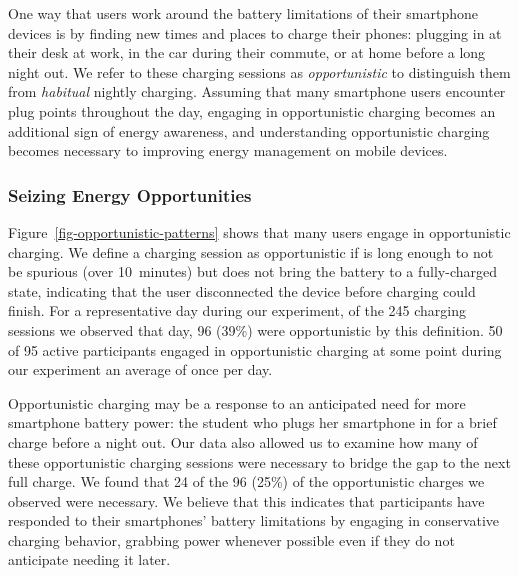 One way that users work around the battery limitations of their smartphone
devices is by finding new times and places to charge their phones: plugging
in at their desk at work, in the car during their commute, or at home before
a long night out. We refer to these charging sessions as
\textit{opportunistic} to distinguish them from \textit{habitual} nightly
charging. Assuming that many smartphone users encounter plug points
throughout the day, engaging in opportunistic charging becomes an additional
sign of energy awareness, and understanding opportunistic charging becomes
necessary to improving energy management on mobile devices.

\subsubsection{Seizing Energy Opportunities}

Figure~\ref{fig-opportunistic-patterns} shows that many users engage in
opportunistic charging. We define a charging session as opportunistic if is
long enough to not be spurious (over 10~minutes) but does not bring the
battery to a fully-charged state, indicating that the user disconnected the
device before charging could finish. For a representative day during our
experiment, of the 245 charging sessions we observed that day, 96 (39\%) were
opportunistic by this definition. 50 of 95 active participants engaged in
opportunistic charging at some point during our experiment an average of once
per day.

Opportunistic charging may be a response to an anticipated need for more
smartphone battery power: the student who plugs her smartphone in for a brief
charge before a night out. Our data also allowed us to examine how many of
these opportunistic charging sessions were necessary to bridge the gap to the
next full charge. We found that 24 of the 96 (25\%) of the opportunistic
charges we observed were necessary. We believe that this indicates that
participants have responded to their smartphones' battery limitations by
engaging in conservative charging behavior, grabbing power whenever possible
even if they do not anticipate needing it later.

